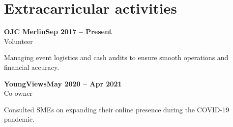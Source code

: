 \documentclass[letterpaper,10pt]{article}
\newcommand{\heading}[2]{
  \hspace{10pt}#1\hfill#2\\
}
\newcommand{\headingBf}[2]{
  \heading{\textbf{#1}}{\textbf{#2}}
}
\newcommand{\subtext}[1]{
  \hspace{10pt}#1
}
\newenvironment{resume_list}{
  \vspace{-7pt}
  \begin{itemize}[itemsep=2pt, parsep=1pt, leftmargin=30pt]
}{
  \end{itemize}
}
\begin{document}

  \section{Extracarricular activities}

  \headingBf{OJC Merlin}{Sep 2017 -- Present}
  \subtext{Volunteer}
    \begin{resume_list}
      \item Managing event logistics and cash audits to ensure smooth operations and financial accuracy.
  \end{resume_list}
    \headingBf{YoungViews}{May 2020 -- Apr 2021}
  \subtext{Co-owner}
    \begin{resume_list}
      \item Consulted SMEs on expanding their online presence during the COVID-19 pandemic.
  \end{resume_list}


\end{document}
